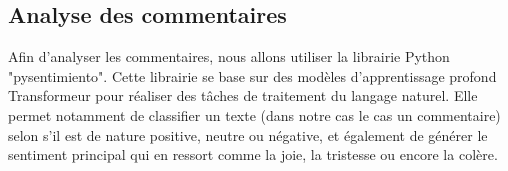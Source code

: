 \subsection{Analyse des commentaires}
Afin d'analyser les commentaires, nous allons utiliser la librairie Python "pysentimiento". Cette librairie se base sur des modèles d'apprentissage profond Transformeur pour réaliser des tâches de traitement du langage naturel. Elle permet notamment de classifier un texte (dans notre cas le cas un commentaire) selon s'il est de nature positive, neutre ou négative, et également de générer le sentiment principal qui en ressort comme la joie, la tristesse ou encore la colère.
